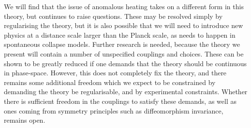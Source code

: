 \documentclass[aps,pra,showpacs,citeautoscript,amsmath,amssymb,floatfix,superscriptaddress,bbm, verbatim,amsfonts,changes,12pt,nofootinbib,longbibliography]{revtex4-2}
\begin{document}
We will find that the issue of anomalous heating takes on a different form in this theory,
	but continues to raise questions. These may be resolved simply by regularising the theory, but it is also possible that we will need to introduce new physics at a distance scale larger than the Planck scale, as needs to happen in spontaneous collapse models\cite{ballentine1991failure,gallis1991comparison,shimony1990desiderata,donadi2021underground}. %
	Further  research is needed, because the theory we present will contain a number of unspecified couplings and choices. These can be shown to be greatly reduced if one demands that the theory should be continuous in phase-space\cite{UCLPawula}. However, this does not completely fix the theory, and there remains some additional freedom which we expect to be constrained by demanding the theory be regularisable, and by experimental constraints. Whether there is sufficient freedom in the couplings to satisfy these demands, as well as ones coming from symmetry principles such as diffeomorphism invariance, remains open.
	
\end{document}
